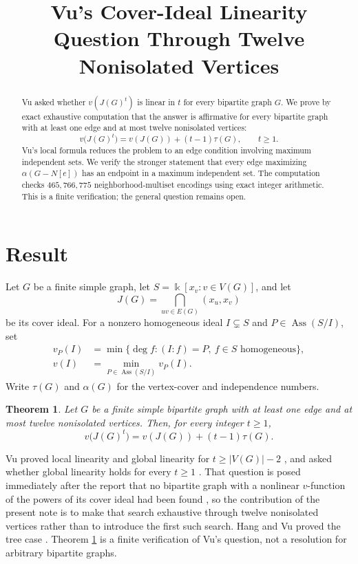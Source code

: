 \documentclass[11pt]{amsart}
\title[Vu's Linearity Question Through Twelve Vertices]
{Vu's Cover-Ideal Linearity Question Through Twelve Nonisolated Vertices}
\date{}
\newtheorem{theorem}{Theorem}
\DeclareMathOperator{\Ass}{Ass}
\begin{document}
\begin{abstract}
Vu asked whether $v(J(G)^t)$ is linear in $t$ for every bipartite graph $G$.
We prove by exact exhaustive computation that the answer is affirmative for every
bipartite graph with at least one edge and at most twelve nonisolated vertices:
\[
  v\bigl(J(G)^t\bigr)=v(J(G))+(t-1)\tau(G),\qquad t\geq1.
\]
Vu's local formula reduces the problem to an edge condition involving maximum
independent sets. We verify the stronger statement that every edge maximizing
$\alpha(G-N[e])$ has an endpoint in a maximum independent set. The computation
checks $465{,}766{,}775$ neighborhood-multiset encodings using exact integer
arithmetic. This is a finite verification; the general question remains open.
\end{abstract}

\maketitle

\section{Result}

Let $G$ be a finite simple graph, let $S=\Bbbk[x_v:v\in V(G)]$, and let
\[
  J(G)=\bigcap_{uv\in E(G)}(x_u,x_v)
\]
be its cover ideal. For a nonzero homogeneous ideal $I\subsetneq S$ and
$P\in\Ass(S/I)$, set
\begin{align*}
  v_P(I)&=\min\{\deg f:(I:f)=P,\ f\in S\text{ homogeneous}\},\\
  v(I)&=\min_{P\in\Ass(S/I)}v_P(I).
\end{align*}
Write $\tau(G)$ and $\alpha(G)$ for the vertex-cover and independence numbers.

\begin{theorem}\label{thm:main}
Let $G$ be a finite simple bipartite graph with at least one edge and at most
twelve nonisolated vertices. Then, for every integer $t\geq1$,
\[
  v\bigl(J(G)^t\bigr)=v(J(G))+(t-1)\tau(G).
\]
\end{theorem}

Vu proved local linearity \cite[Theorem~1.3]{Vu} and global linearity for
$t\geq |V(G)|-2$ \cite[Lemma~3.1]{Vu}, and asked whether global linearity holds
for every $t\geq1$ \cite[Question~3.2]{Vu}. That question is posed immediately
after the report that no bipartite graph with a nonlinear $v$-function of the
powers of its cover ideal had been found \cite[remark preceding
Question~3.2]{Vu}, so the contribution of the present note is to make that
search exhaustive through twelve nonisolated vertices rather than to introduce
the first such search. Hang and Vu proved the tree case
\cite[Theorem~1.2]{HangVu}. Theorem \ref{thm:main} is a finite verification of
Vu's question, not a resolution for arbitrary bipartite graphs.
\end{document}
